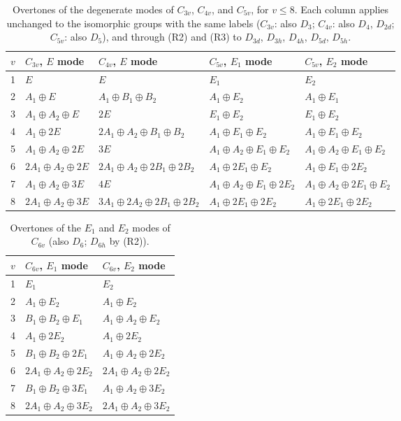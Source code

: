 \documentclass[11pt]{article}
\begin{document}
\begin{table}[H]
\centering\small
\begin{tabular}{c|llll}
\hline
$v$ & $C_{3v}$, $E$ mode & $C_{4v}$, $E$ mode & $C_{5v}$, $E_{1}$ mode & $C_{5v}$, $E_{2}$ mode\\
\hline
1 & $E$ & $E$ & $E_{1}$ & $E_{2}$\\
2 & $A_{1}\oplus E$ & $A_{1}\oplus B_{1}\oplus B_{2}$ & $A_{1}\oplus E_{2}$ & $A_{1}\oplus E_{1}$\\
3 & $A_{1}\oplus A_{2}\oplus E$ & $2E$ & $E_{1}\oplus E_{2}$ & $E_{1}\oplus E_{2}$\\
4 & $A_{1}\oplus 2E$ & $2A_{1}\oplus A_{2}\oplus B_{1}\oplus B_{2}$ & $A_{1}\oplus E_{1}\oplus E_{2}$ & $A_{1}\oplus E_{1}\oplus E_{2}$\\
5 & $A_{1}\oplus A_{2}\oplus 2E$ & $3E$ & $A_{1}\oplus A_{2}\oplus E_{1}\oplus E_{2}$ & $A_{1}\oplus A_{2}\oplus E_{1}\oplus E_{2}$\\
6 & $2A_{1}\oplus A_{2}\oplus 2E$ & $2A_{1}\oplus A_{2}\oplus 2B_{1}\oplus 2B_{2}$ & $A_{1}\oplus 2E_{1}\oplus E_{2}$ & $A_{1}\oplus E_{1}\oplus 2E_{2}$\\
7 & $A_{1}\oplus A_{2}\oplus 3E$ & $4E$ & $A_{1}\oplus A_{2}\oplus E_{1}\oplus 2E_{2}$ & $A_{1}\oplus A_{2}\oplus 2E_{1}\oplus E_{2}$\\
8 & $2A_{1}\oplus A_{2}\oplus 3E$ & $3A_{1}\oplus 2A_{2}\oplus 2B_{1}\oplus 2B_{2}$ & $A_{1}\oplus 2E_{1}\oplus 2E_{2}$ & $A_{1}\oplus 2E_{1}\oplus 2E_{2}$\\
\hline
\end{tabular}
\caption{Overtones of the degenerate modes of $C_{3v}$, $C_{4v}$, and $C_{5v}$, for $v\le8$. Each column applies unchanged to the isomorphic groups with the same labels ($C_{3v}$: also $D_3$; $C_{4v}$: also $D_4$, $D_{2d}$; $C_{5v}$: also $D_5$), and through (R2) and (R3) to $D_{3d}$, $D_{3h}$, $D_{4h}$, $D_{5d}$, $D_{5h}$.}
\label{tab:axial}
\end{table}

\begin{table}[H]
\centering\small
\begin{tabular}{c|ll}
\hline
$v$ & $C_{6v}$, $E_{1}$ mode & $C_{6v}$, $E_{2}$ mode\\
\hline
1 & $E_{1}$ & $E_{2}$\\
2 & $A_{1}\oplus E_{2}$ & $A_{1}\oplus E_{2}$\\
3 & $B_{1}\oplus B_{2}\oplus E_{1}$ & $A_{1}\oplus A_{2}\oplus E_{2}$\\
4 & $A_{1}\oplus 2E_{2}$ & $A_{1}\oplus 2E_{2}$\\
5 & $B_{1}\oplus B_{2}\oplus 2E_{1}$ & $A_{1}\oplus A_{2}\oplus 2E_{2}$\\
6 & $2A_{1}\oplus A_{2}\oplus 2E_{2}$ & $2A_{1}\oplus A_{2}\oplus 2E_{2}$\\
7 & $B_{1}\oplus B_{2}\oplus 3E_{1}$ & $A_{1}\oplus A_{2}\oplus 3E_{2}$\\
8 & $2A_{1}\oplus A_{2}\oplus 3E_{2}$ & $2A_{1}\oplus A_{2}\oplus 3E_{2}$\\
\hline
\end{tabular}
\caption{Overtones of the $E_1$ and $E_2$ modes of $C_{6v}$ (also $D_6$; $D_{6h}$ by (R2)).}
\label{tab:axial2}
\end{table}
\end{document}
